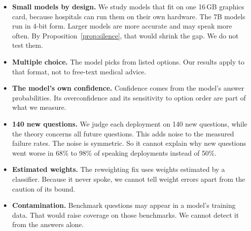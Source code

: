 \documentclass[11pt]{article}
\theoremstyle{plain}
\theoremstyle{definition}
\begin{document}
\begin{itemize}[leftmargin=1.4em]
    \item \textbf{Small models by design.} We study models that fit on one 16\,GB graphics card, because hospitals can run them on their own hardware. The 7B models run in 4-bit form. Larger models are more accurate and may speak more often. By Proposition~\ref{prop:silence}, that would shrink the gap. We do not test them.
    \item \textbf{Multiple choice.} The model picks from listed options. Our results apply to that format, not to free-text medical advice.
    \item \textbf{The model's own confidence.} Confidence comes from the model's answer probabilities. Its overconfidence and its sensitivity to option order are part of what we measure.
    \item \textbf{140 new questions.} We judge each deployment on 140 new questions, while the theory concerns all future questions. This adds noise to the measured failure rates. The noise is symmetric. So it cannot explain why new questions went worse in 68\% to 98\% of speaking deployments instead of 50\%.
    \item \textbf{Estimated weights.} The reweighting fix uses weights estimated by a classifier. Because it never spoke, we cannot tell weight errors apart from the caution of its bound.
    \item \textbf{Contamination.} Benchmark questions may appear in a model's training data. That would raise coverage on those benchmarks. We cannot detect it from the answers alone.
\end{itemize}
\end{document}

